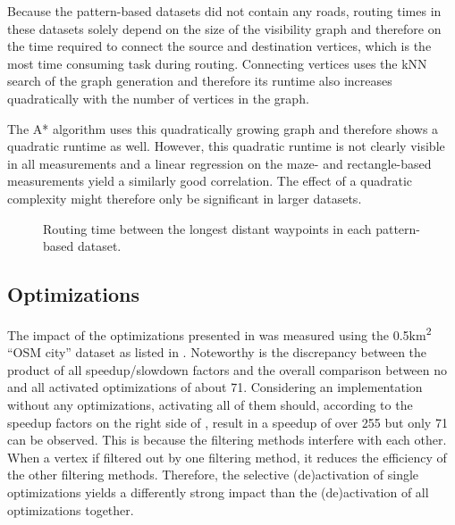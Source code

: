 			Because the pattern-based datasets did not contain any roads, routing times in these datasets solely depend on the size of the visibility graph and therefore on the time required to connect the source and destination vertices, which is the most time consuming task during routing.
			Connecting vertices uses the kNN search of the graph generation and therefore its runtime also increases quadratically with the number of vertices in the graph.
			
			The A* algorithm uses this quadratically growing graph and therefore shows a quadratic runtime as well.
			However, this quadratic runtime is not clearly visible in all measurements and a linear regression on the maze- and rectangle-based measurements yield a similarly good correlation.
			The effect of a quadratic complexity might therefore only be significant in larger datasets.
			
			\begin{figure}[h!]
				\hspace{-20pt}
				
				\caption{Routing time between the longest distant waypoints in each pattern-based dataset.}
				\label{fig:eval-pattern-routing-details}
			\end{figure}
		
	\subsection{Optimizations}
	
		The impact of the optimizations presented in  was measured using the 0.5km\textsuperscript{2} \enquote{OSM city} dataset as listed in .
		Noteworthy is the discrepancy between the product of all speedup/slowdown factors and the overall comparison between no and all activated optimizations of about 71.
		Considering an implementation without any optimizations, activating all of them should, according to the speedup factors on the right side of , result in a speedup of over 255 but only 71 can be observed.
		This is because the filtering methods interfere with each other.
		When a vertex if filtered out by one filtering method, it reduces the efficiency of the other filtering methods.
		Therefore, the selective (de)activation of single optimizations yields a differently strong impact than the (de)activation of all optimizations together.
		
